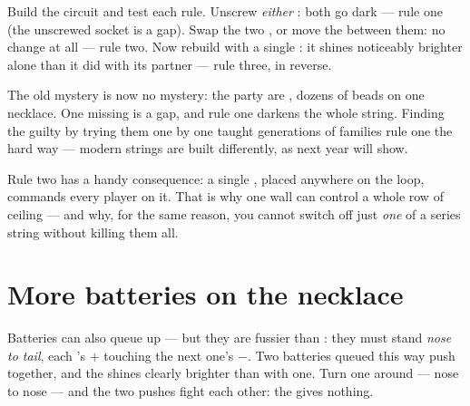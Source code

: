 \begin{example}\label{ex:g4:series-circuits:seeing}
Build the  circuit and test each rule. Unscrew \emph{either}
: both go dark --- rule one (the unscrewed socket is a gap).
Swap the two , or move the  between them: no change at
all --- rule two. Now rebuild with a single : it shines
noticeably brighter alone than it did with its partner --- rule
three, in reverse.
\end{example}

\begin{example}\label{ex:g4:series-circuits:partylights}
The old mystery is now no mystery: the party  are ,
dozens of beads on one necklace. One missing  is a gap, and rule
one darkens the whole string. Finding the guilty  by trying
them one by one taught generations of families rule one the hard
way --- modern strings are built differently, as next year will
show.
\end{example}

\begin{remark}\label{rem:g4:series-circuits:switch}
Rule two has a handy consequence: a single , placed anywhere
on the loop, commands every player on it. That is why one wall
 can control a whole row of ceiling  --- and why, for
the same reason, you cannot switch off just \emph{one}  of a
series string without killing them all.
\end{remark}

\section{More batteries on the necklace}

\begin{example}\label{ex:g4:series-circuits:batteries}
Batteries can also queue up  --- but they are fussier than
: they must stand \emph{nose to tail}, each 's $+$
touching the next one's $-$. Two batteries queued this way push
together, and the  shines clearly brighter than with one. Turn
one  around --- nose to nose --- and the two pushes fight
each other: the  gives nothing.
\end{example}

